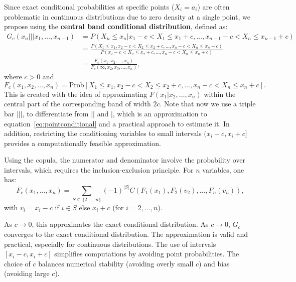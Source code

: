 \documentclass[
	11pt, %
	fleqn, %
	a4paper, %
]{LegrandOrangeBook}
\begin{document}
Since exact conditional probabilities at specific points ($X_i = a_i$) are often problematic in continuous distributions due to zero density at a single point, we propose using the \textbf{central band conditional distribution}, defined as:
\begin{align}
G_c(x_n ||| x_1,\ldots, x_{n-1}) &= P(X_n \leq x_n | x_1-c < X_1 \leq x_1+c,\ldots, x_{n-1}-c < X_n \leq x_{n-1}+c) \nonumber\\
&= \frac{P(X_1 \leq x_1, x_2-c < X_2 \leq x_2+c,\ldots, x_n-c < X_n \leq x_n+c)}{P(x_2-c < X_2 \leq x_2+c,\ldots, x_n-c < X_n \leq x_n+c)} \nonumber\\
&= \frac{F_c(x_1, x_2,\ldots, x_n)}{F_c(\infty, x_2, x_3,\ldots, x_n)},
\label{eq:centralband}
\end{align}
where $c > 0$ and
\begin{equation}
F_c(x_1, x_2,\ldots, x_n) = \text{Prob}[X_1 \leq x_1, x_2-c < X_2 \leq x_2+c,\ldots, x_n-c < X_n \leq x_n+c].
\label{eq:intervalcdf}
\end{equation}
This is created with the idea of approximating $F(x_1|x_2,\ldots, x_n)$ within the central part of the corresponding band of width $2c$. Note that now we use a triple bar $|||$, to differentiate from $||$ and $|$, which is an approximation to equation~\eqref{eq:pointconditional} and a practical approach to estimate it. In addition, restricting the conditioning variables to small intervals $(x_i - c, x_i + c]$ provides a computationally feasible approximation.

Using the copula, the numerator and denominator involve the probability over intervals, which requires the inclusion-exclusion principle. For $n$ variables, one has:
\begin{equation}
F_c(x_1,\ldots, x_n) = \sum_{S \subseteq \{2,\ldots, n\}} (-1)^{|S|} C(F_1(x_1), F_2(v_2),\ldots, F_n(v_n)),
\end{equation}
with $v_i = x_i - c$ if $i \in S$ else $x_i + c$ (for $i = 2,\ldots, n$).

As $c \to 0$, this approximates the exact conditional distribution. As $c \to 0$, $G_c$ converges to the exact conditional distribution. The approximation is valid and practical, especially for continuous distributions. The use of intervals $[x_i - c, x_i + c]$ simplifies computations by avoiding point probabilities. The choice of $c$ balances numerical stability (avoiding overly small $c$) and bias (avoiding large $c$).
\end{document}
